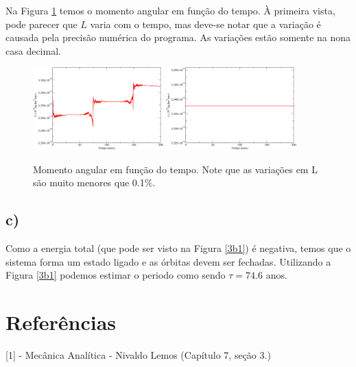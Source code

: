 \documentclass[a4wide]{report}
\begin{document}
Na Figura \ref{3b2} temos o momento angular em função do tempo. À primeira vista, pode parecer que $L$ varia com o tempo, mas deve-se notar que a variação é causada pela precisão numérica do programa. As variações estão somente na nona casa decimal. 

\begin{figure}[!htb]
\centering
\includegraphics[width=0.447\textwidth]{L2.pdf}
\includegraphics[width=0.447\textwidth]{L.pdf}
\caption{Momento angular em função do tempo. Note que as variações em L são muito menores que 0.1$\%$. }
\label{3b2}
\end{figure}

\subsection*{c)}
Como a energia total (que pode ser visto na Figura \ref{3b1}) é negativa, temos que o sistema forma um estado ligado e as órbitas devem ser fechadas. Utilizando a Figura \ref{3b1} podemos estimar o periodo como sendo $\tau = 74.6$ anos.


\section{Referências}
[1] - Mecânica Analítica - Nivaldo Lemos (Capítulo 7, seção 3.)
\end{document}

